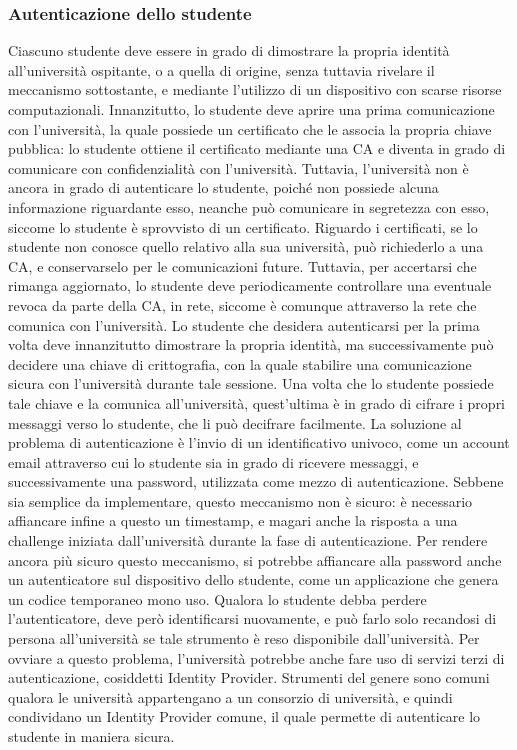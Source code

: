 \documentclass[a4paper,12pt]{article}
\begin{document}
\subsubsection{Autenticazione dello studente}
Ciascuno studente deve essere in grado di dimostrare la propria identità all'università ospitante, o a quella di origine, senza tuttavia rivelare il meccanismo sottostante, e mediante l'utilizzo di un dispositivo con scarse risorse computazionali.
\newline Innanzitutto, lo studente deve aprire una prima comunicazione con l'università, la quale possiede un certificato che le associa la propria chiave pubblica: lo studente ottiene il certificato mediante una CA e diventa in grado di comunicare con confidenzialità con l'università. Tuttavia, l'università non è ancora in grado di autenticare lo studente, poiché non possiede alcuna informazione riguardante esso, neanche può comunicare in segretezza con esso, siccome lo studente è sprovvisto di un certificato. Riguardo i certificati, se lo studente non conosce quello relativo alla sua università, può richiederlo a una CA, e conservarselo per le comunicazioni future. Tuttavia, per accertarsi che rimanga aggiornato, lo studente deve periodicamente controllare una eventuale revoca da parte della CA, in rete, siccome è comunque attraverso la rete che comunica con l'università.
\newline Lo studente che desidera autenticarsi per la prima volta deve innanzitutto dimostrare la propria identità, ma successivamente può decidere una chiave di crittografia, con la quale stabilire una comunicazione sicura con l'università durante tale sessione. Una volta che lo studente possiede tale chiave e la comunica all'università, quest'ultima è in grado di cifrare i propri messaggi verso lo studente, che li può decifrare facilmente.
\newline La soluzione al problema di autenticazione è l'invio di un identificativo univoco, come un account email attraverso cui lo studente sia in grado di ricevere messaggi, e successivamente una password, utilizzata come mezzo di autenticazione. Sebbene sia semplice da implementare, questo meccanismo non è sicuro: è necessario affiancare infine a questo un timestamp, e magari anche la risposta a una challenge iniziata dall'università durante la fase di autenticazione.
\newline Per rendere ancora più sicuro questo meccanismo, si potrebbe affiancare alla password anche un autenticatore sul dispositivo dello studente, come un applicazione che genera un codice temporaneo mono uso. Qualora lo studente debba perdere l'autenticatore, deve però identificarsi nuovamente, e può farlo solo recandosi di persona all'università se tale strumento è reso disponibile dall'università. Per ovviare a questo problema, l'università potrebbe anche fare uso di servizi terzi di autenticazione, cosiddetti Identity Provider. Strumenti del genere sono comuni qualora le università appartengano a un consorzio di università, e quindi condividano un Identity Provider comune, il quale permette di autenticare lo studente in maniera sicura.
\end{document}
